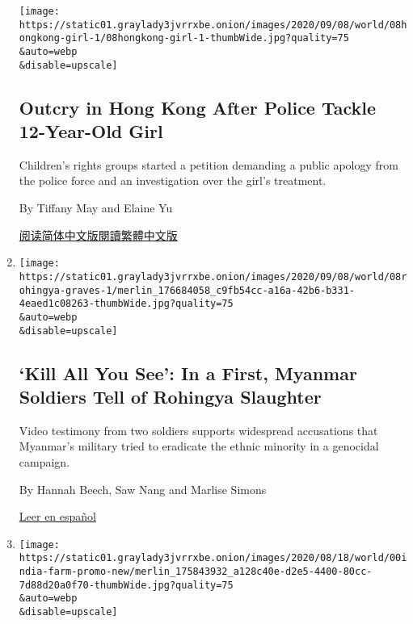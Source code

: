 \begin{enumerate}
  \texttt{[image: https://static01.graylady3jvrrxbe.onion/images/2020/09/08/world/08hongkong-girl-1/08hongkong-girl-1-thumbWide.jpg?quality=75\\\&auto=webp\\\&disable=upscale]}

  \hypertarget{outcry-in-hong-kong-after-police-tackle-12-year-old-girl}{%
  \subsection{Outcry in Hong Kong After Police Tackle 12-Year-Old
  Girl}\label{outcry-in-hong-kong-after-police-tackle-12-year-old-girl}}

  Children's rights groups started a petition demanding a public apology
  from the police force and an investigation over the girl's treatment.

  By Tiffany May and Elaine Yu

  \href{https://cn.nytimes3xbfgragh.onion/china/20200909/hong-kong-girl-police-video/}{阅读简体中文版}\href{https://cn.nytimes3xbfgragh.onion/china/20200909/hong-kong-girl-police-video/zh-hant/}{閱讀繁體中文版}
\item
  \href{/2020/09/08/world/asia/myanmar-rohingya-genocide.html}{}

  \texttt{[image: https://static01.graylady3jvrrxbe.onion/images/2020/09/08/world/08rohingya-graves-1/merlin\_176684058\_c9fb54cc-a16a-42b6-b331-4eaed1c08263-thumbWide.jpg?quality=75\\\&auto=webp\\\&disable=upscale]}

  \hypertarget{kill-all-you-see-in-a-first-myanmar-soldiers-tell-of-rohingya-slaughter}{%
  \subsection{`Kill All You See': In a First, Myanmar Soldiers Tell of
  Rohingya
  Slaughter}\label{kill-all-you-see-in-a-first-myanmar-soldiers-tell-of-rohingya-slaughter}}

  Video testimony from two soldiers supports widespread accusations that
  Myanmar's military tried to eradicate the ethnic minority in a
  genocidal campaign.

  By Hannah Beech, Saw Nang and Marlise Simons

  \href{https://www.nytimes3xbfgragh.onion/es/2020/09/08/espanol/mundo/rohinya-genocidio-birmania.html}{Leer
  en español}
\item
  \href{/2020/09/08/world/asia/india-coronavirus-farmer-suicides-lockdown.html}{}

  \texttt{[image: https://static01.graylady3jvrrxbe.onion/images/2020/08/18/world/00india-farm-promo-new/merlin\_175843932\_a128c40e-d2e5-4400-80cc-7d88d20a0f70-thumbWide.jpg?quality=75\\\&auto=webp\\\&disable=upscale]}


\end{enumerate}
